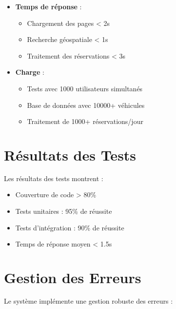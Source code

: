\begin{itemize}
    \item \textbf{Temps de réponse} :
    \begin{itemize}
        \item Chargement des pages < 2s
        \item Recherche géospatiale < 1s
        \item Traitement des réservations < 3s
    \end{itemize}
    
    \item \textbf{Charge} :
    \begin{itemize}
        \item Tests avec 1000 utilisateurs simultanés
        \item Base de données avec 10000+ véhicules
        \item Traitement de 1000+ réservations/jour
    \end{itemize}
\end{itemize}

\section{Résultats des Tests}
Les résultats des tests montrent :

\begin{itemize}
    \item Couverture de code > 80\%
    \item Tests unitaires : 95\% de réussite
    \item Tests d'intégration : 90\% de réussite
    \item Temps de réponse moyen < 1.5s
\end{itemize}

\section{Gestion des Erreurs}
Le système implémente une gestion robuste des erreurs :

